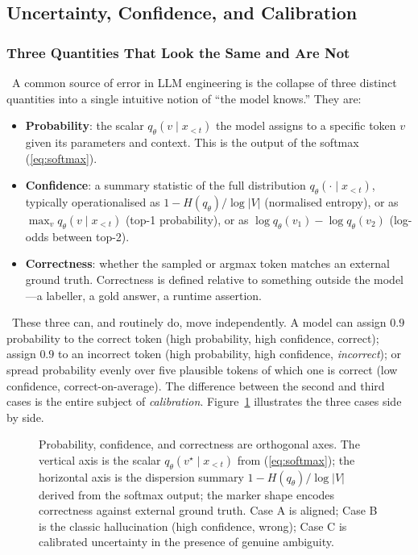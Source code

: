 \subsection{Uncertainty, Confidence, and Calibration}

\subsubsection{Three Quantities That Look the Same and Are Not}

\Def\ A common source of error in LLM engineering is the collapse of
three distinct quantities into a single intuitive notion of ``the model
knows.'' They are:
\begin{itemize}
  \item \textbf{Probability}: the scalar $q_\theta(v \mid x_{<t})$ the
  model assigns to a specific token $v$ given its parameters and
  context. This is the output of the softmax (\ref{eq:softmax}).
  \item \textbf{Confidence}: a summary statistic of the full
  distribution $q_\theta(\cdot \mid x_{<t})$, typically operationalised
  as $1 - H(q_\theta) / \log |V|$ (normalised entropy), or as $\max_v
  q_\theta(v \mid x_{<t})$ (top-1 probability), or as $\log q_\theta(v_1)
  - \log q_\theta(v_2)$ (log-odds between top-2).
  \item \textbf{Correctness}: whether the sampled or argmax token
  matches an external ground truth. Correctness is defined relative to
  something outside the model---a labeller, a gold answer, a runtime
  assertion.
\end{itemize}

\Emp\ These three can, and routinely do, move independently. A model
can assign $0.9$ probability to the correct token (high probability,
high confidence, correct); assign $0.9$ to an incorrect token (high
probability, high confidence, \emph{incorrect}); or spread probability
evenly over five plausible tokens of which one is correct (low
confidence, correct-on-average). The difference between the second and
third cases is the entire subject of \emph{calibration}.
Figure~\ref{fig:prob_conf_corr} illustrates the three cases side by
side.

\begin{figure}[H]
  \centering
  
  \caption{Probability, confidence, and correctness are orthogonal
           axes. The vertical axis is the scalar
           $q_\theta(v^\star \mid x_{<t})$ from (\ref{eq:softmax}); the
           horizontal axis is the dispersion summary
           $1 - H(q_\theta)/\log|V|$ derived from the softmax output;
           the marker shape encodes correctness against external
           ground truth. Case A is aligned; Case B is the classic
           hallucination (high confidence, wrong); Case C is
           calibrated uncertainty in the presence of genuine
           ambiguity.}
  \label{fig:prob_conf_corr}
\end{figure}

